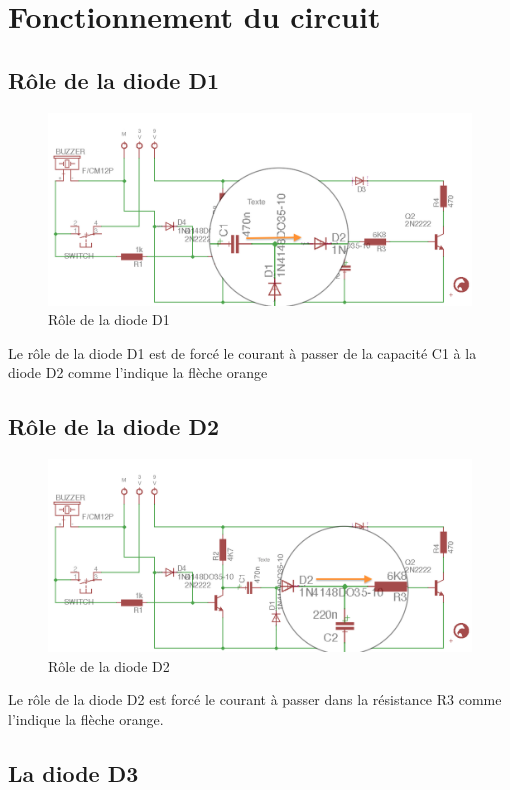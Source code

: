 \chapter{Fonctionnement du circuit}

\section{Rôle de la diode D1}
\begin{figure}[H]
\centering
\includegraphics[width=1\textwidth]{ressources/roleDiodeD1}
\caption{Rôle de la diode D1}
\end{figure}

Le rôle de la diode D1 est de forcé le courant à passer de la capacité C1 à la diode D2 comme l'indique la flèche orange
\section{Rôle de la diode D2}
\begin{figure}[H]
\centering
\includegraphics[width=1\textwidth]{ressources/roleDiodeD2}
\caption{Rôle de la diode D2}
\end{figure}

Le rôle de la diode D2 est forcé le courant à passer dans la résistance R3 comme l'indique la flèche orange.

\section{La diode D3}

